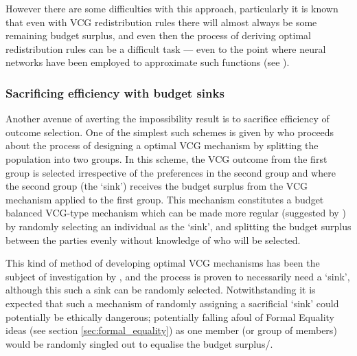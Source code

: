 However there are some difficulties with this approach, particularly it is known that even with VCG redistribution rules there will almost always be some remaining budget surplus, and even then the process of deriving optimal redistribution rules can be a difficult task --- even to the point where neural networks have been employed to approximate such functions (see \cite{DBLP:conf/atal/ManishaJG18}).

\subsubsection{Sacrificing efficiency with budget sinks}

Another avenue of averting the impossibility result is to sacrifice efficiency of outcome selection.
One of the simplest such schemes is given by \cite{Faltings2004b, Boi_faltings_patent}
who proceeds about the process of designing a \DIFdelbegin {}\DIFdelend \DIFaddbegin {}\DIFaddend optimal VCG mechanism by splitting the population into two groups.
In this scheme, the VCG outcome from the first group is selected irrespective of the preferences in the second group and where the second group (the `sink') receives the budget surplus from the VCG mechanism applied to the first group.
This mechanism constitutes a budget balanced VCG-type mechanism which can be made more regular (suggested by \cite{10.1007/978-3-642-25510-6_14}) by randomly selecting an individual as the `sink', and splitting the budget surplus between the parties evenly without knowledge of who will be selected.

This kind of method of developing \DIFdelbegin {}\DIFdelend \DIFaddbegin {}\DIFaddend optimal VCG mechanisms has been the subject of investigation by \cite{NATH2019673}, and the process is proven to necessarily need a `sink', although this such a sink can be randomly selected.
Notwithstanding it is expected that such a mechanism of randomly assigning a sacrificial `sink' could potentially be ethically dangerous; potentially falling afoul of Formal Equality ideas (see section \ref{sec:formal_equality}) as one member (or group of members) would be randomly singled out to equalise the budget surplus/\DIFdelbegin {}\DIFdelend \DIFaddbegin {}\DIFaddend .



